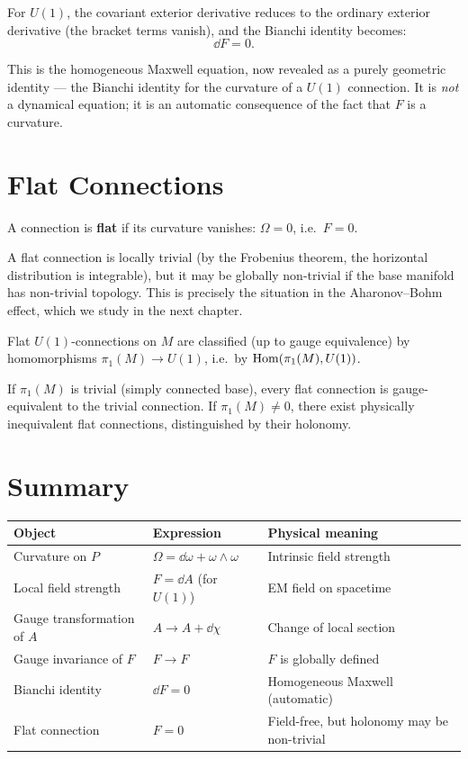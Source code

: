 For $U(1)$, the covariant exterior derivative reduces to the ordinary exterior derivative (the bracket terms vanish), and the Bianchi identity becomes:
\begin{equation}
\dd F = 0.
\end{equation}

This is the homogeneous Maxwell equation, now revealed as a purely geometric identity --- the Bianchi identity for the curvature of a $U(1)$ connection. It is \emph{not} a dynamical equation; it is an automatic consequence of the fact that $F$ is a curvature.

\section{Flat Connections}

\begin{definition}
A connection is \textbf{flat} if its curvature vanishes: $\Omega = 0$, i.e.\ $F = 0$.
\end{definition}

A flat connection is locally trivial (by the Frobenius theorem, the horizontal distribution is integrable), but it may be globally non-trivial if the base manifold has non-trivial topology. This is precisely the situation in the Aharonov--Bohm effect, which we study in the next chapter.

\begin{proposition}
Flat $U(1)$-connections on $M$ are classified (up to gauge equivalence) by homomorphisms $\pi_1(M) \to U(1)$, i.e.\ by $\operatorname{Hom}(\pi_1(M), U(1))$.
\end{proposition}

If $\pi_1(M)$ is trivial (simply connected base), every flat connection is gauge-equivalent to the trivial connection. If $\pi_1(M) \neq 0$, there exist physically inequivalent flat connections, distinguished by their holonomy.

\section{Summary}

\begin{table}[h]
\centering
\renewcommand{\arraystretch}{1.4}
\begin{tabular}{lll}
\toprule
\textbf{Object} & \textbf{Expression} & \textbf{Physical meaning} \\
\midrule
Curvature on $P$ & $\Omega = \dd\omega + \omega\wedge\omega$ & Intrinsic field strength \\
Local field strength & $F = \dd A$ (for $U(1)$) & EM field on spacetime \\
Gauge transformation of $A$ & $A \to A + \dd\chi$ & Change of local section \\
Gauge invariance of $F$ & $F \to F$ & $F$ is globally defined \\
Bianchi identity & $\dd F = 0$ & Homogeneous Maxwell (automatic) \\
Flat connection & $F = 0$ & Field-free, but holonomy may be non-trivial \\
\bottomrule
\end{tabular}
\end{table}

